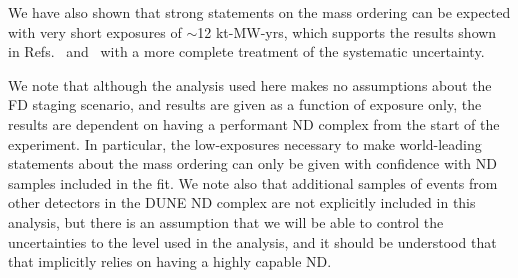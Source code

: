 We have also shown that strong statements on the mass ordering can be expected with very short exposures of $\sim$12 kt-MW-yrs, which supports the results shown in Refs.~\cite{Abi:2020qib} and~\cite{Abi:2020evt} with a more complete treatment of the systematic uncertainty.

We note that although the analysis used here makes no assumptions about the FD staging scenario, and results are given as a function of exposure only, the results are dependent on having a performant ND complex from the start of the experiment. In particular, the low-exposures necessary to make world-leading statements about the mass ordering can only be given with confidence with ND samples included in the fit. We note also that additional samples of events from other detectors in the DUNE ND complex are not explicitly included in this analysis, but there is an assumption that we will be able to control the uncertainties to the level used in the analysis, and it should be understood that that implicitly relies on having a highly capable ND.
